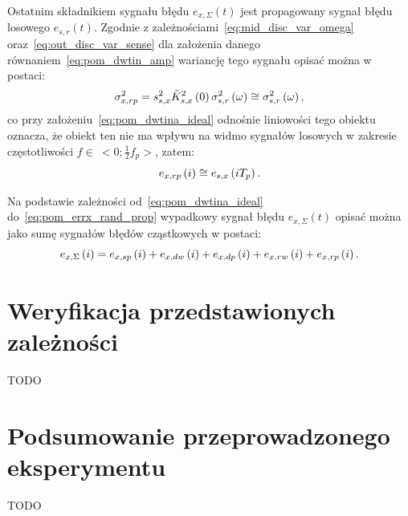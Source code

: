 Ostatnim składnikiem sygnału błędu $e_{x,\Sigma}(t)$ jest propagowany sygnał błędu losowego $e_{s,r}(t)$. Zgodnie z zależnościami~\eqref{eq:mid_disc_var_omega} oraz~\eqref{eq:out_disc_var_sense} dla założenia danego równaniem~\eqref{eq:pom_dwtin_amp} wariancję tego sygnału opisać można w postaci:
\begin{equation}
\sigma_{x,rp}^{2} = s_{s,x}^{2} \tilde{K}_{s,x}^{2} \left(0\right) \sigma_{s,r}^{2} \left(\omega\right) \cong \sigma_{s,r}^{2} \left(\omega\right) \label{eq:pom_varx_rand_prop},
\end{equation}
co przy założeniu~\eqref{eq:pom_dwtina_ideal} odnośnie liniowości tego obiektu oznacza, że obiekt ten nie ma wpływu na widmo sygnałów losowych w zakresie częstotliwości $f \in~<0; \frac{1}{2} f_{p}>$, zatem:
\begin{equation}
e_{x,rp} \left(i\right) \cong e_{s,x} \left(i T_{p}\right) \label{eq:pom_errx_rand_prop}.
\end{equation}

Na podstawie zależności od~\eqref{eq:pom_dwtina_ideal} do~\eqref{eq:pom_errx_rand_prop} wypadkowy sygnał błędu $e_{x,\Sigma}(t)$ opisać można jako sumę sygnałów błędów cząstkowych w postaci:
\begin{equation}
e_{x,\Sigma} \left(i\right) = e_{x,sp} \left(i\right) + e_{x,dw} \left(i\right) + e_{x,dp} \left(i\right) + e_{x,rw} \left(i\right) + e_{x,rp} \left(i\right) \label{eq:pom_errx_sum}.
\end{equation}

\section{Weryfikacja przedstawionych zależności}

TODO

\section{Podsumowanie przeprowadzonego eksperymentu}

TODO

